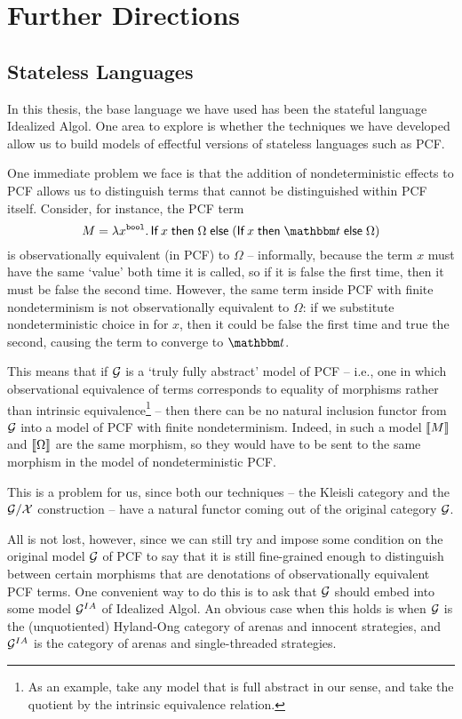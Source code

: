 \chapter{Further Directions}
\label{ChapFurtherDirections}

\section{Stateless Languages}
\label{SecStatelessLanguages}

In this thesis, the base language we have used has been the stateful language Idealized Algol.  
One area to explore is whether the techniques we have developed allow us to build models of effectful versions of stateless languages such as PCF.

One immediate problem we face is that the addition of nondeterministic effects to PCF allows us to distinguish terms that cannot be distinguished within PCF itself.  
Consider, for instance, the PCF term
\[
  M = \lambda x^{\bool}.\If x \Then \Omega \Else (\If x \Then \true \Else \Omega)
  \]
is observationally equivalent (in PCF) to $\Omega$ -- informally, because the term $x$ must have the same `value' both time it is called, so if it is false the first time, then it must be false the second time.
However, the same term inside PCF with finite nondeterminism is not observationally equivalent to $\Omega$: if we substitute nondeterministic choice in for $x$, then it could be false the first time and true the second, causing the term to converge to $\true$.

This means that if $\mathcal G$ is a `truly fully abstract' model of PCF -- i.e., one in which observational equivalence of terms corresponds to equality of morphisms rather than intrinsic equivalence\footnote{As an example, take any model that is full abstract in our sense, and take the quotient by the intrinsic equivalence relation.} -- then there can be no natural inclusion functor from $\mathcal G$ into a model of PCF with finite nondeterminism.  
Indeed, in such a model $\left\llbracket M\right\rrbracket$ and $\left\llbracket\Omega\right\rrbracket$ are the same morphism, so they would have to be sent to the same morphism in the model of nondeterministic PCF.

This is a problem for us, since both our techniques -- the Kleisli category and the $\mathcal G/\mathcal X$ construction -- have a natural functor coming out of the original category $\mathcal G$.

All is not lost, however, since we can still try and impose some condition on the original model $\mathcal G$ of PCF to say that it is still fine-grained enough to distinguish between certain morphisms that are denotations of observationally equivalent PCF terms.  
One convenient way to do this is to ask that $\mathcal G$ should embed into some model $\mathcal G^{IA}$ of Idealized Algol.  
An obvious case when this holds is when $\mathcal G$ is the (unquotiented) Hyland-Ong category of arenas and innocent strategies, and $\mathcal G^{IA}$ is the category of arenas and single-threaded strategies.

